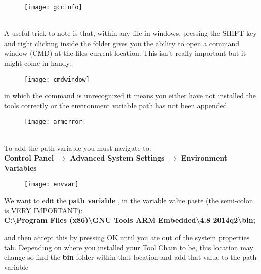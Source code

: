 \begin{figure}[hbtp]
\centering
\texttt{[image: gccinfo]}
\end{figure}
\\
A useful trick to note is that, within any file in windows, pressing the SHIFT key and right clicking inside the folder gives you the ability to open a command window (CMD) at the files current location. This isn't really important but it might come in handy.
\begin{figure}[hbtp]
\centering
\texttt{[image: cmdwindow]}
\end{figure}
\newpage
{
\color{Red} \underline{} in which the command is unrecognized it means you either have not installed the tools correctly or the environment variable path has not been appended.
\begin{figure}[htbp]
\centering
\texttt{[image: armerror]}
\end{figure}
\\
To add the path variable you must navigate to:
\\
\centering
\textbf{\color{Green} Control Panel $\rightarrow$ Advanced System Settings $\rightarrow$ Environment Variables}
\\
\begin{figure}[hbtp]
\centering
\texttt{[image: envvar]}
\end{figure}
\raggedright
We want to edit the \textbf{path variable} , in the variable value paste (the semi-colon is VERY IMPORTANT):
\\
\centering
\textbf{\color{Aquamarine} C:\textbackslash Program Files (x86)\textbackslash GNU Tools ARM Embedded\textbackslash 4.8 2014q2\textbackslash bin;}
\\
\raggedright
and then accept this by pressing OK until you are out of the system properties tab. Depending on where you installed your Tool Chain to be, this location may change so find the \textbf{bin} folder within that location and add that value to the path variable
}
\newpage
